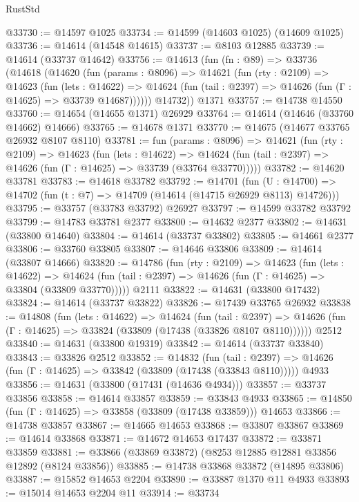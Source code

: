 \begin{lexlean}{RustStd}
\begin{coremodule}
@33730 := @14597 @1025
@33734 := @14599 (@14603 @1025) (@14609 @1025)
@33736 := @14614 (@14548 @14615)
@33737 := @8103 @12885
@33739 := @14614 (@33737 @14642)
@33756 := @14613
    (fun (fn : @89) =>
    @33736
      (@14618
        (@14620
          (fun (params : @8096) =>
          @14621
            (fun (rty : @2109) =>
            @14623
              (fun (lets : @14622) =>
              @14624 (fun (tail : @2397) => @14626 (fun (Γ : @14625) => @33739 @14687))))))
        @14732))
    @1371
@33757 := @14738 @14550
@33760 := @14654 (@14655 @1371) @26929
@33764 := @14614 (@14646 (@33760 @14662) @14666)
@33765 := @14678 @1371
@33770 := @14675 (@14677 @33765 @26932 @8107 @8110)
@33781 := fun (params : @8096) =>
  @14621
    (fun (rty : @2109) =>
    @14623
      (fun (lets : @14622) =>
      @14624 (fun (tail : @2397) => @14626 (fun (Γ : @14625) => @33739 (@33764 @33770)))))
@33782 := @14620 @33781
@33783 := @14618 @33782
@33792 := @14701
    (fun (U : @14700) => @14702 (fun (t : @7) => @14709 (@14614 (@14715 @26929 @8113) @14726)))
@33795 := @33757 (@33783 @33792) @26927
@33797 := @14599 @33782 @33792
@33799 := @14783 @33781 @2377
@33800 := @14632 @2377
@33802 := @14631 (@33800 @14640)
@33804 := @14614 (@33737 @33802)
@33805 := @14661 @2377
@33806 := @33760 @33805
@33807 := @14646 @33806
@33809 := @14614 (@33807 @14666)
@33820 := @14786
    (fun (rty : @2109) =>
    @14623
      (fun (lets : @14622) =>
      @14624 (fun (tail : @2397) => @14626 (fun (Γ : @14625) => @33804 (@33809 @33770)))))
    @2111
@33822 := @14631 (@33800 @17432)
@33824 := @14614 (@33737 @33822)
@33826 := @17439 @33765 @26932
@33838 := @14808
    (fun (lets : @14622) =>
    @14624
      (fun (tail : @2397) =>
      @14626 (fun (Γ : @14625) => @33824 (@33809 (@17438 (@33826 @8107 @8110))))))
    @2512
@33840 := @14631 (@33800 @19319)
@33842 := @14614 (@33737 @33840)
@33843 := @33826 @2512
@33852 := @14832
    (fun (tail : @2397) => @14626 (fun (Γ : @14625) => @33842 (@33809 (@17438 (@33843 @8110)))))
    @4933
@33856 := @14631 (@33800 (@17431 (@14636 @4934)))
@33857 := @33737 @33856
@33858 := @14614 @33857
@33859 := @33843 @4933
@33865 := @14850 (fun (Γ : @14625) => @33858 (@33809 (@17438 @33859))) @14653
@33866 := @14738 @33857
@33867 := @14665 @14653
@33868 := @33807 @33867
@33869 := @14614 @33868
@33871 := @14672 @14653 @17437
@33872 := @33871 @33859
@33881 := @33866 (@33869 @33872) (@8253 @12885 @12881 @33856 @12892 (@8124 @33856))
@33885 := @14738 @33868 @33872 (@14895 @33806)
@33887 := @15852 @14653 @2204
@33890 := @33887 @1370 @11 @4933
@33893 := @15014 @14653 @2204 @11
@33914 := @33734

\end{coremodule}
\end{lexlean}
